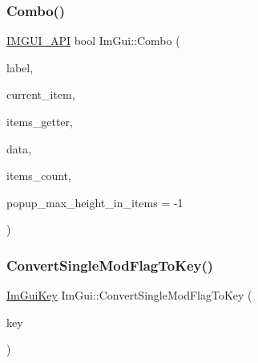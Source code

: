 \mbox{\label{namespaceImGui_ae667a68f13233556aa1de9f672dd3f25}} 
\subsubsection{\texorpdfstring{Combo()}{Combo()}\hspace{0.1cm}{\footnotesize\ttfamily [3/3]}}
{\footnotesize\ttfamily \hyperlink{imgui_8h_a43829975e84e45d1149597467a14bbf5}{I\+M\+G\+U\+I\+\_\+\+A\+PI} bool Im\+Gui\+::\+Combo (\begin{DoxyParamCaption}\item[{const char $\ast$}]{label,  }\item[{int $\ast$}]{current\+\_\+item,  }\item[{bool($\ast$)(\hyperlink{imgui__impl__opengl3__loader_8h_ac668e7cffd9e2e9cfee428b9b2f34fa7}{void} $\ast$\hyperlink{imgui__impl__opengl3__loader_8h_abd87654504355b4c1bb002dcb1d4d16a}{data}, int idx, const char $\ast$$\ast$out\+\_\+text)}]{items\+\_\+getter,  }\item[{\hyperlink{imgui__impl__opengl3__loader_8h_ac668e7cffd9e2e9cfee428b9b2f34fa7}{void} $\ast$}]{data,  }\item[{int}]{items\+\_\+count,  }\item[{int}]{popup\+\_\+max\+\_\+height\+\_\+in\+\_\+items = {\ttfamily -\/1} }\end{DoxyParamCaption})}

\mbox{\label{namespaceImGui_ad540a8f07e5834f77f76a84626cdc70e}} 
\subsubsection{\texorpdfstring{Convert\+Single\+Mod\+Flag\+To\+Key()}{ConvertSingleModFlagToKey()}}
{\footnotesize\ttfamily \hyperlink{imgui_8h_aa22ffe36b188427d712447ec465203d4}{Im\+Gui\+Key} Im\+Gui\+::\+Convert\+Single\+Mod\+Flag\+To\+Key (\begin{DoxyParamCaption}\item[{\hyperlink{imgui_8h_aa22ffe36b188427d712447ec465203d4}{Im\+Gui\+Key}}]{key }\end{DoxyParamCaption})\hspace{0.3cm}{\ttfamily [inline]}}

